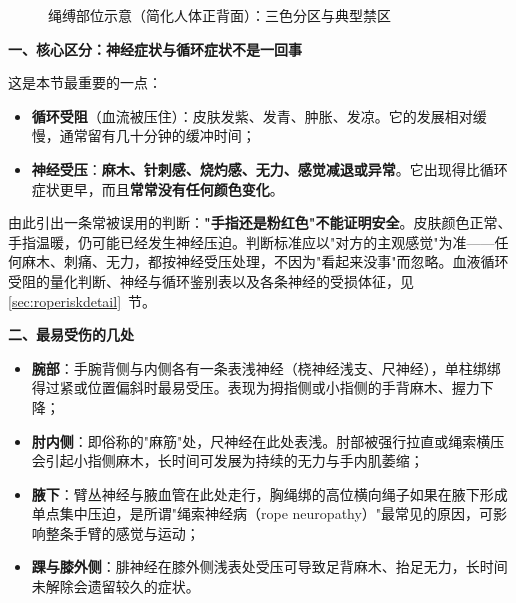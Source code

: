 \documentclass[12pt,UTF8]{ctexbook}
\begin{document}
\begin{figure}[htbp]
\caption{绳缚部位示意（简化人体正背面）：三色分区与典型禁区}
\label{fig:ropezones}
\end{figure}

\textbf{一、核心区分：神经症状与循环症状不是一回事}

这是本节最重要的一点：

\begin{itemize}
\item \textbf{循环受阻}（血流被压住）：皮肤发紫、发青、肿胀、发凉。它的发展相对缓慢，通常留有几十分钟的缓冲时间；
\item \textbf{神经受压}：\textbf{麻木、针刺感、烧灼感、无力、感觉减退或异常}。它出现得比循环症状更早，而且\textbf{常常没有任何颜色变化}。
\end{itemize}

由此引出一条常被误用的判断：\textbf{"手指还是粉红色"不能证明安全}。皮肤颜色正常、手指温暖，仍可能已经发生神经压迫。判断标准应以"对方的主观感觉"为准——任何麻木、刺痛、无力，都按神经受压处理，不因为"看起来没事"而忽略。血液循环受阻的量化判断、神经与循环鉴别表以及各条神经的受损体征，见\ref{sec:roperiskdetail}~节。

\textbf{二、最易受伤的几处}

\begin{itemize}
\item \textbf{腕部}：手腕背侧与内侧各有一条表浅神经（桡神经浅支、尺神经），单柱绑绑得过紧或位置偏斜时最易受压。表现为拇指侧或小指侧的手背麻木、握力下降；
\item \textbf{肘内侧}：即俗称的"麻筋"处，尺神经在此处表浅。肘部被强行拉直或绳索横压会引起小指侧麻木，长时间可发展为持续的无力与手内肌萎缩；
\item \textbf{腋下}：臂丛神经与腋血管在此处走行，胸绳绑的高位横向绳子如果在腋下形成单点集中压迫，是所谓"绳索神经病（rope neuropathy）"最常见的原因，可影响整条手臂的感觉与运动；
\item \textbf{踝与膝外侧}：腓神经在膝外侧浅表处受压可导致足背麻木、抬足无力，长时间未解除会遗留较久的症状。
\end{itemize}
\end{document}
